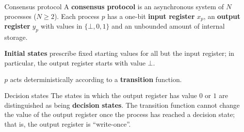 \documentclass[12pt]{beamer}
\begin{document}
  \begin{frame}{Consensus protocol}
    A \textbf{consensus protocol} is an asynchronous system of \(N\) processes
    (\(N\ge 2\)). Each process \(p\) has a one-bit \textbf{input register}
    \(x_p\), an \textbf{output register} \(y_p\) with values in \(\{\bot, 0,
    1\}\) and an unbounded amount of internal storage.

    \vspace{0.25cm}

    \textbf{Initial states} prescribe fixed starting values for all but the
    input register; in particular, the output register starts with value
    \(\bot\).

    \vspace{0.25cm}

    \(p\) acts deterministically according to a \textbf{transition} function.
  \end{frame}

  \begin{frame}{Decision states}
    The states in which the output register has value \(0\) or \(1\) are
    distinguished as being \textbf{decision states}. The transition function
    cannot change the value of the output register once the process has reached
    a decision state; that is, the output register is ``write-once''.

    \vspace{0.25cm}

    \begin{figure}
    \end{figure}
  \end{frame}
\end{document}
